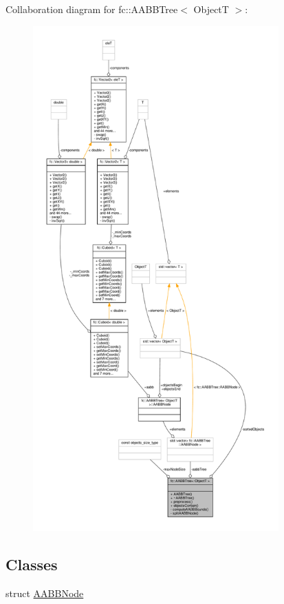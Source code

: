 Collaboration diagram for fc\+:\+:A\+A\+B\+B\+Tree$<$ ObjectT $>$\+:
\nopagebreak
\begin{figure}[H]
\begin{center}
\leavevmode
\includegraphics[height=550pt]{d0/dea/classfc_1_1AABBTree__coll__graph}
\end{center}
\end{figure}
\subsection*{Classes}
\begin{DoxyCompactItemize}
\item 
struct \hyperlink{structfc_1_1AABBTree_1_1AABBNode}{A\+A\+B\+B\+Node}
\end{DoxyCompactItemize}
